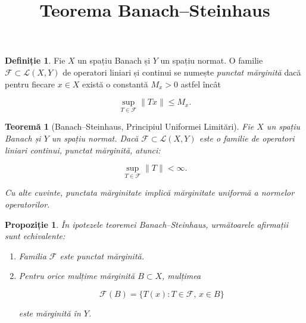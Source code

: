 \documentclass[12pt]{article}
\title{Teorema Banach--Steinhaus}
\author{}
\date{}
\theoremstyle{definition}
\newtheorem{definition}{Definiție}
\theoremstyle{plain}
\newtheorem{theorem}{Teoremă}
\newtheorem{proposition}{Propoziție}
\begin{document}
\maketitle

\begin{definition}
Fie $X$ un spațiu Banach și $Y$ un spațiu normat. O familie $\mathcal{F} \subset \mathcal{L}(X,Y)$
de operatori liniari și continui se numește \emph{punctat mărginită} dacă pentru fiecare $x \in X$ există o constantă $M_x > 0$ astfel încât


\[
\sup_{T \in \mathcal{F}} \|T x\| \le M_x.
\]


\end{definition}

\begin{theorem}[Banach--Steinhaus, Principiul Uniformei Limitări]
Fie $X$ un spațiu Banach și $Y$ un spațiu normat. Dacă $\mathcal{F} \subset \mathcal{L}(X,Y)$ este o familie de operatori liniari continui, punctat mărginită, atunci:


\[
\sup_{T \in \mathcal{F}} \|T\| < \infty.
\]


Cu alte cuvinte, punctata mărginitate implică mărginitate uniformă a normelor operatorilor.
\end{theorem}

\begin{proposition}
În ipotezele teoremei Banach--Steinhaus, următoarele afirmații sunt echivalente:
\begin{enumerate}
    \item[(i)] Familia $\mathcal{F}$ este punctat mărginită.
    \item[(ii)] Pentru orice mulțime mărginită $B \subset X$, mulțimea
    

\[
    \mathcal{F}(B) = \{ T(x) : T \in \mathcal{F},\, x \in B \}
    \]


    este mărginită în $Y$.
\end{enumerate}
\end{proposition}
\end{document}
